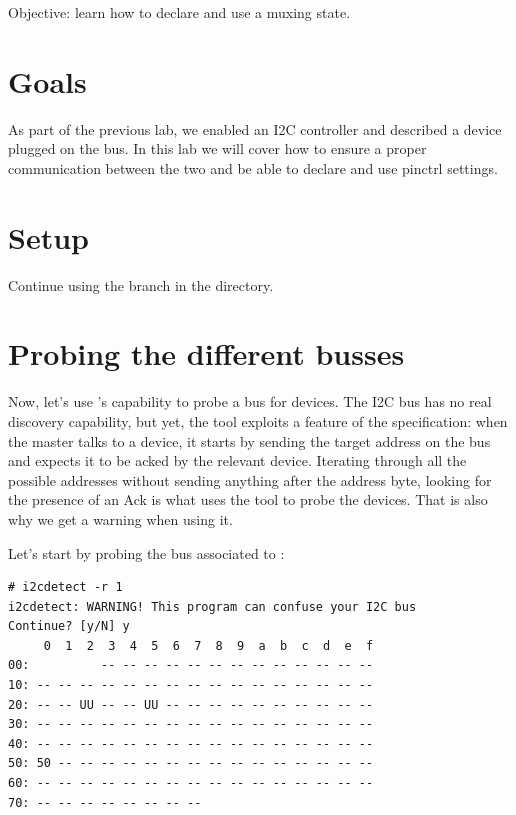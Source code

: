 {Objective: learn how to declare and use a muxing state.}

\section{Goals}

As part of the previous lab, we enabled an I2C controller and described
a device plugged on the bus. In this lab we will cover how to ensure a
proper communication between the two and be able to declare and use
pinctrl settings.

\section{Setup}

Continue using the  branch in the
 directory.

\section{Probing the different busses}

Now, let's use 's capability to probe a bus for
devices. The I2C bus has no real discovery capability, but yet, the tool
exploits a feature of the specification: when the master talks to a
device, it starts by sending the target address on the bus and expects
it to be acked by the relevant device. Iterating through all the
possible addresses without sending anything after the address byte,
looking for the presence of an Ack is what uses the tool to probe the
devices. That is also why we get a warning when using it.

Let's start by probing the bus associated to :

\begin{verbatim}
# i2cdetect -r 1
i2cdetect: WARNING! This program can confuse your I2C bus
Continue? [y/N] y
     0  1  2  3  4  5  6  7  8  9  a  b  c  d  e  f
00:          -- -- -- -- -- -- -- -- -- -- -- -- -- 
10: -- -- -- -- -- -- -- -- -- -- -- -- -- -- -- -- 
20: -- -- UU -- -- UU -- -- -- -- -- -- -- -- -- -- 
30: -- -- -- -- -- -- -- -- -- -- -- -- -- -- -- -- 
40: -- -- -- -- -- -- -- -- -- -- -- -- -- -- -- -- 
50: 50 -- -- -- -- -- -- -- -- -- -- -- -- -- -- -- 
60: -- -- -- -- -- -- -- -- -- -- -- -- -- -- -- -- 
70: -- -- -- -- -- -- -- --     
\end{verbatim}

